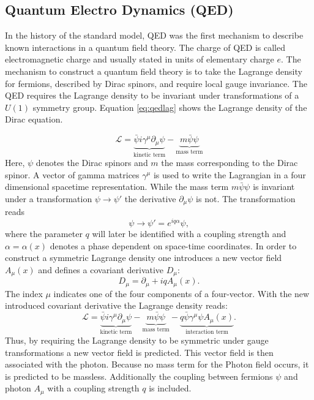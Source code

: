 	\subsection{Quantum Electro Dynamics (QED)}
	In the history of the standard model, QED was the first mechanism to describe known interactions in a quantum field theory. The charge of QED is called electromagnetic charge and usually stated in units of elementary charge $e$. The mechanism to construct a quantum field theory is to take the Lagrange density for fermions, described by Dirac spinors, and require local gauge invariance. The QED requires the Lagrange density to be invariant under transformations of a $U(1)$ symmetry group. Equation \ref{eq:qedlag} shows the Lagrange density of the Dirac equation. 
	
	\begin{equation}
	\mathcal{L} = \underbrace{\bar{\psi} i \gamma^\mu \partial_\mu \psi}_{\text{kinetic term}} - \underbrace{m \bar{\psi} \psi}_{\text{mass term}}
	\label{eq:qedlag}
	\end{equation}
	Here, $\psi$ denotes the Dirac spinors and $m$ the mass corresponding to the Dirac spinor. A vector of gamma matrices $\gamma^\mu$ is used to write the Lagrangian in a four dimensional spacetime representation. While the mass term $m \bar{\psi} \psi$ is invariant under a transformation $\psi \rightarrow \psi'$ the derivative $\partial_\mu \psi$ is not. The transformation reads
	\begin{equation}
	\psi \rightarrow \psi' = e^{i q \alpha} \psi,
	\label{eq:trafo}
	\end{equation}
	where the parameter $q$ will later be identified with a coupling strength and $\alpha = \alpha(x)$ denotes a phase dependent on space-time coordinates. In order to construct a symmetric Lagrange density one introduces a new vector field $A_\mu(x)$ and defines a covariant derivative $D_\mu$:
	\begin{equation}
	D_\mu = \partial_\mu + i q A_\mu(x).
	\end{equation}
	The index $\mu$ indicates one of the four components of a four-vector. With the new introduced covariant derivative the Lagrange density reads:
	\begin{equation}
	\mathcal{L} = \underbrace{\bar{\psi} i \gamma^\mu \partial_\mu \psi}_{\text{kinetic term}} - \underbrace{m \bar{\psi} \psi}_{\text{mass term}} - \underbrace{q \bar{\psi} \gamma^\mu \psi A_\mu(x)}_{\text{interaction term}}.
	\end{equation}
	Thus, by requiring the Lagrange density to be symmetric under gauge transformations a new vector field is predicted. This vector field is then associated with the photon. Because no mass term for the Photon field occurs, it is predicted to be massless. Additionally the coupling between fermions $\psi$ and photon $A_\mu$ with a coupling strength $q$ is included. \cite{ModernParticlePhysics}
